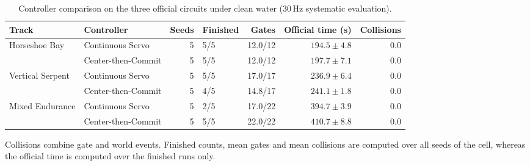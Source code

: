 \begin{table}[t]
\centering
\caption{Controller comparison on the three official circuits under clean water ($30$\,Hz systematic evaluation).}
\label{tab:clean_tracks}
\mratablestyle
\begin{tabular}{@{}llrlrrr@{}}
\toprule
Track & Controller & Seeds & Finished & Gates & Official time (s) & Collisions \\
\midrule
\multirow{2}{*}{Horseshoe Bay}
 & Continuous Servo    & 5 & 5/5 & 12.0/12 & $194.5\pm4.8$ & 0.0 \\
 & Center-then-Commit  & 5 & 5/5 & 12.0/12 & $197.7\pm7.1$ & 0.0 \\
\midrule
\multirow{2}{*}{Vertical Serpent}
 & Continuous Servo    & 5 & 5/5 & 17.0/17 & $236.9\pm6.4$ & 0.0 \\
 & Center-then-Commit  & 5 & 4/5 & 14.8/17 & $241.1\pm1.8$ & 0.0 \\
\midrule
\multirow{2}{*}{Mixed Endurance}
 & Continuous Servo    & 5 & 2/5 & 17.0/22 & $394.7\pm3.9$ & 0.0 \\
 & Center-then-Commit  & 5 & 5/5 & 22.0/22 & $410.7\pm8.8$ & 0.0 \\
\bottomrule
\end{tabular}
\mratablenote
Collisions combine gate and world events. Finished counts, mean gates and mean
collisions are computed over all seeds of the cell, whereas the official time is
computed over the finished runs only.
\end{table}
